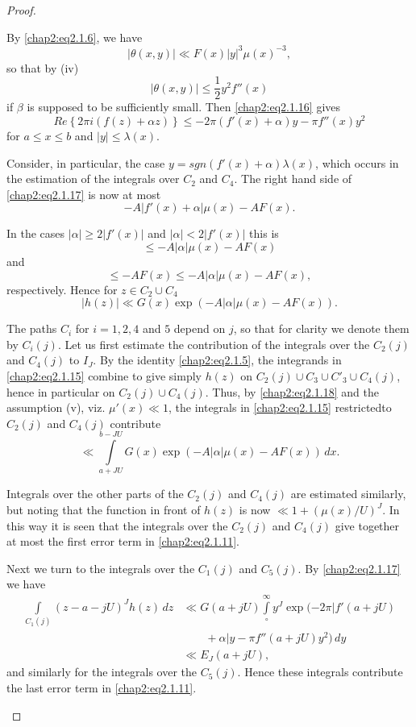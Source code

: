 \begin{proof}
\begin{enumerate}
By \eqref{chap2:eq2.1.6}, we have 
$$
|\theta(x,y)|\ll F(x)|y|^3\mu(x)^{-3},
$$\pageoriginale
so that by (iv)
$$
|\theta(x,y)|\leq\frac{1}{2}y^2f''(x)
$$
if $\beta$ is supposed to be sufficiently small. Then
\eqref{chap2:eq2.1.16} gives 
\begin{equation}\label{chap2:eq2.1.17}
Re\left\{ 2\pi i(f(z)+\alpha z)\right\}\leq -2\pi(f'(x)+\alpha)y -\pi
f''(x)y^2 
\end{equation}
for $a\leq x\leq b$ and $|y|\leq \lambda(x)$.

Consider, in particular, the case $y=sgn(f'(x)+\alpha)\lambda(x)$,
which occurs in the estimation of the integrals over $C_2$ and
$C_4$. The right hand side of \eqref{chap2:eq2.1.17} is now at most 
$$
-A|f'(x)+\alpha|\mu(x)-AF(x).
$$

In the cases $|\alpha|\geq 2|f'(x)|$ and $|\alpha|<2|f'(x)|$ this is 
$$
\leq -A|\alpha|\mu(x)-AF(x)
$$
and 
$$
\leq -AF(x)\leq -A|\alpha|\mu(x)-AF(x),
$$
respectively. Hence for $z\in C_2\cup C_4$
\begin{equation}\label{chap2:eq2.1.18}
|h(z)|\ll G(x)\exp(-A|\alpha|\mu(x)-AF(x)).
\end{equation}

The paths $C_i$ for $i=1,2,4$ and $5$ depend on $j$, so that for
clarity we denote them by $C_i(j)$. Let us first estimate the
contribution of the integrals over the $C_2(j)$ and $C_4(j)$ to
$I_J$. By the identity \eqref{chap2:eq2.1.5}, the integrands in
\eqref{chap2:eq2.1.15} combine to give simply $h(z)$ on $C_2(j) \cup
C_3\cup C'_3\cup C_4(j)$, hence in particular on $C_2(j)\cup
C_4(j)$. Thus, by \eqref{chap2:eq2.1.18} and the assumption (v),
viz. $\mu'(x)\ll 1$, the integrals in \eqref{chap2:eq2.1.15}
restricted\pageoriginale to $C_2(j)$ and $C_4(j)$ contribute
$$
\ll \int\limits_{a+JU}^{b-JU}G(x)\exp(-A|\alpha|\mu(x)-AF(x))\,dx.
$$

Integrals over the other parts of the $C_2(j)$ and $C_4(j)$ are
estimated similarly, but noting that the function in front of $h(z)$
is now $\ll 1+(\mu(x)/U)^J$. In this way it is seen that the integrals
over the $C_2(j)$ and $C_4(j)$ give together at most the first error
term in \eqref{chap2:eq2.1.11}. 

Next we turn to the integrals over the $C_1(j)$ and $C_5(j)$. By
\eqref{chap2:eq2.1.17} we have 
\begin{align*}
\int\limits_{C_1(j)}(z-a-jU)^Jh(z)\,dz & \ll G(a+jU)
\int\limits_\circ^\infty y^J\exp(-2\pi|f'(a+jU)\\
&\qquad +\alpha|y-\pi f''(a+jU)y^2)\,dy\\
& \ll E_J(a+jU),
\end{align*}
and similarly for the integrals over the $C_5(j)$. Hence these
integrals contribute the last error term in \eqref{chap2:eq2.1.11}.


\end{enumerate}
\end{proof}
